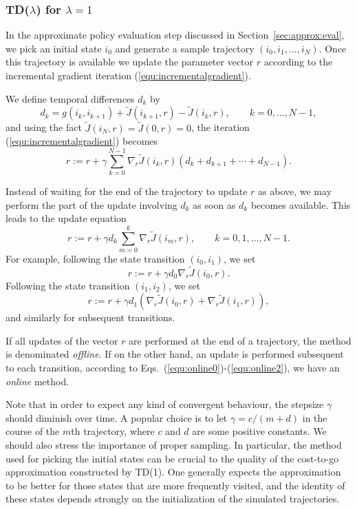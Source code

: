 \subsubsection*{TD($\lambda$) for $\lambda=1$}
In the approximate policy evaluation step discussed in Section~\ref{sec:approx:eval}, we pick an initial state $i_0$ and generate a sample trajectory $(i_0,i_1,\ldots,i_N)$. Once this trajectory is available we update the parameter vector $r$ according to the incremental gradient iteration (\ref{equ:incrementalgradient}). 

We define temporal differences $d_k$ by 
\begin{equation} \label{equ:temporaldifferences}
d_k=g(i_k,i_{k+1})+\tilde J(i_{k+1},r) - \tilde J(i_k,r), \qquad k=0,\ldots, N-1,
\end{equation}
and using the fact $\tilde J(i_N,r) = \tilde J(0,r) = 0$, the iteration (\ref{equ:incrementalgradient}) becomes
\begin{equation} \label{equ:incrementaltd}
r := r + \gamma \sum_{k=0}^{N-1} \nabla_r \tilde J(i_k,r)(d_k + d_{k+1}+\cdots+d_{N-1}).
\end{equation}

Instead of waiting for the end of the trajectory to update $r$ as above, we may perform the part of the update involving $d_k$ as soon as $d_k$ becomes available. This leads to the update equation
\begin{equation} \label{equ:online0}
r:=r+\gamma d_k \sum_{m=0}^k \nabla_r \tilde J(i_m,r), \qquad k= 0,1,\ldots,N-1.
\end{equation}
For example, following the state transition $(i_0,i_1)$, we set
\begin{equation} \label{equ:online1}
r:=r+\gamma d_0 \nabla_r \tilde J(i_0,r).
\end{equation}
Following the state transition $(i_1,i_2)$, we set 
\begin{equation} \label{equ:online2}
r:=r+\gamma d_1 \left( \nabla_r \tilde J(i_0,r) + \nabla_r \tilde J(i_1,r) \right), 
\end{equation}
and similarly for subsequent transitions.

If all updates of the vector $r$ are performed at the end of a trajectory, the method is denominated \emph{offline}. If on the other hand, an update is performed subsequent to each transition, according to Eqs.\ (\ref{equ:online0})-(\ref{equ:online2}), we have an \emph{online} method.

Note that in order to expect any kind of convergent behaviour, the stepsize $\gamma$ should diminish over time. A popular choice is to let $\gamma = c/(m+d)$ in the course of the $m$th trajectory, where $c$ and $d$ are some positive constants. We should also stress the importance of proper sampling. In particular, the method used for picking the initial states can be crucial to the quality of the cost-to-go approximation constructed by TD(1). One generally expects the approximation to be better for those states that are more frequently visited, and the identity of these states depends strongly on the initialization of the simulated trajectories.







